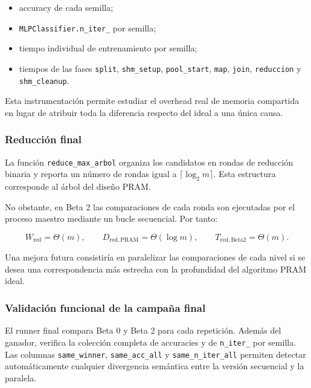 \documentclass[11pt,a4paper]{article}
\begin{document}
\begin{itemize}[leftmargin=*]
    \item accuracy de cada semilla;
    \item \texttt{MLPClassifier.n\_iter\_} por semilla;
    \item tiempo individual de entrenamiento por semilla;
    \item tiempos de las fases \texttt{split}, \texttt{shm\_setup},
    \texttt{pool\_start}, \texttt{map}, \texttt{join},
    \texttt{reduccion} y \texttt{shm\_cleanup}.
\end{itemize}

Esta instrumentación permite estudiar el overhead real de memoria compartida en lugar
de atribuir toda la diferencia respecto del ideal a una única causa.

\subsubsection{Reducción final}

La función \texttt{reduce\_max\_arbol} organiza los candidatos en rondas de reducción
binaria y reporta un número de rondas igual a $\lceil\log_2m\rceil$. Esta estructura
corresponde al árbol del diseño PRAM.

No obstante, en Beta 2 las comparaciones de cada ronda son ejecutadas por el proceso
maestro mediante un bucle secuencial. Por tanto:

\begin{equation}
    W_{\mathrm{red}}=\Theta(m),
    \qquad
    D_{\mathrm{red,PRAM}}=\Theta(\log m),
    \qquad
    T_{\mathrm{red,Beta2}}=\Theta(m).
\end{equation}

Una mejora futura consistiría en paralelizar las comparaciones de cada nivel si se desea
una correspondencia más estrecha con la profundidad del algoritmo PRAM ideal.

\subsubsection{Validación funcional de la campaña final}

El runner final compara Beta 0 y Beta 2 para cada repetición. Además del ganador,
verifica la colección completa de accuracies y de \texttt{n\_iter\_} por semilla.
Las columnas \texttt{same\_winner}, \texttt{same\_acc\_all} y
\texttt{same\_n\_iter\_all} permiten detectar automáticamente
cualquier divergencia semántica entre la versión secuencial y la paralela.
\end{document}
